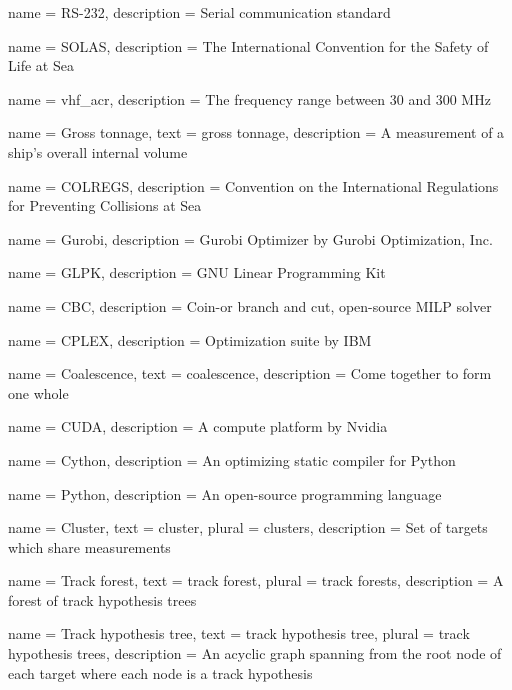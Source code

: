{
	name 		= RS-232,
	description = {Serial communication standard}
}

{
	name 		= SOLAS,
	description = {The International Convention for the Safety of Life at Sea}
}

{
	name 		= \gls{vhf_acr},
	description = {The frequency range between 30 and 300 MHz}
}

{
	name 		= Gross tonnage,
	text 		= gross tonnage,
	description = {A measurement of a ship's overall internal volume}
}

{
	name 		= COLREGS,
	description = {Convention on the International Regulations for Preventing Collisions at Sea}
}

{
	name 		= Gurobi,
	description = {Gurobi Optimizer by Gurobi Optimization, Inc.}
}

{
	name 		= GLPK,
	description = {GNU Linear Programming Kit}
}

{
	name 		= CBC,
	description = {Coin-or branch and cut, open-source MILP solver}
}

{
	name 		= CPLEX,
	description = {Optimization suite by IBM}
}

{
	name 		= Coalescence,
	text 		= coalescence,
	description = {Come together to form one whole}
}

{
	name 		= CUDA,
	description = {A compute platform by Nvidia}
}

{
	name 		= Cython,
	description = {An optimizing static compiler for Python}
}

{
	name 		= Python,
	description = {An open-source programming language}
}

{
	name 		= Cluster,
	text 		= cluster,
	plural 		= clusters,
	description = {Set of \glspl{target} which share \glspl{measurement}}
}

{
	name 		= {Track forest},
	text 		= {track forest},
	plural 		= {track forests},
	description = {A forest of track hypothesis trees}
}

{
	name 		= {Track hypothesis tree},
	text 		= {track hypothesis tree},
	plural 		= {track hypothesis trees},
	description = {An acyclic graph spanning from the root node of each target where each node is a track hypothesis}
}

